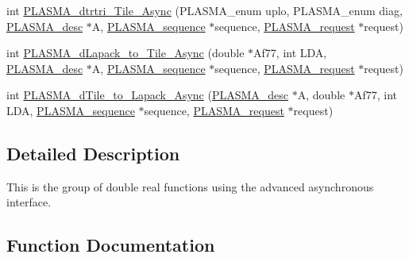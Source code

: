 \begin{DoxyCompactItemize}
\item 
int \hyperlink{group__double__Tile__Async_gade5a0ad83ebd28b50ea703f23af81f7a_gade5a0ad83ebd28b50ea703f23af81f7a}{P\+L\+A\+S\+M\+A\+\_\+dtrtri\+\_\+\+Tile\+\_\+\+Async} (P\+L\+A\+S\+M\+A\+\_\+enum uplo, P\+L\+A\+S\+M\+A\+\_\+enum diag, \hyperlink{structplasma__desc__t}{P\+L\+A\+S\+M\+A\+\_\+desc} $\ast$A, \hyperlink{structplasma__sequence__t}{P\+L\+A\+S\+M\+A\+\_\+sequence} $\ast$sequence, \hyperlink{structplasma__request__t}{P\+L\+A\+S\+M\+A\+\_\+request} $\ast$request)
\item 
int \hyperlink{group__double__Tile__Async_gabe953740e8e30ff55c0b24fdce30ca06_gabe953740e8e30ff55c0b24fdce30ca06}{P\+L\+A\+S\+M\+A\+\_\+d\+Lapack\+\_\+to\+\_\+\+Tile\+\_\+\+Async} (double $\ast$Af77, int L\+D\+A, \hyperlink{structplasma__desc__t}{P\+L\+A\+S\+M\+A\+\_\+desc} $\ast$A, \hyperlink{structplasma__sequence__t}{P\+L\+A\+S\+M\+A\+\_\+sequence} $\ast$sequence, \hyperlink{structplasma__request__t}{P\+L\+A\+S\+M\+A\+\_\+request} $\ast$request)
\item 
int \hyperlink{group__double__Tile__Async_ga14d26f1c44da7797cfe8f8b28e4ae1d5_ga14d26f1c44da7797cfe8f8b28e4ae1d5}{P\+L\+A\+S\+M\+A\+\_\+d\+Tile\+\_\+to\+\_\+\+Lapack\+\_\+\+Async} (\hyperlink{structplasma__desc__t}{P\+L\+A\+S\+M\+A\+\_\+desc} $\ast$A, double $\ast$Af77, int L\+D\+A, \hyperlink{structplasma__sequence__t}{P\+L\+A\+S\+M\+A\+\_\+sequence} $\ast$sequence, \hyperlink{structplasma__request__t}{P\+L\+A\+S\+M\+A\+\_\+request} $\ast$request)
\end{DoxyCompactItemize}


\subsection{Detailed Description}
This is the group of double real functions using the advanced asynchronous interface. 

\subsection{Function Documentation}
\hypertarget{group__double__Tile__Async_ga0d68ce7e82adc06e2062cbd359d305b9_ga0d68ce7e82adc06e2062cbd359d305b9}{}
